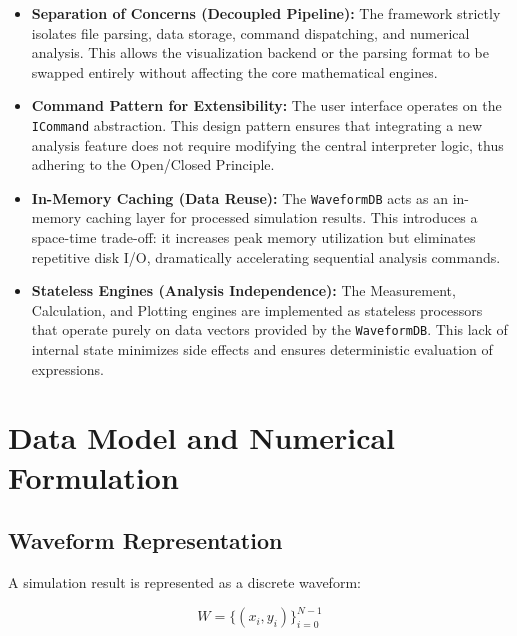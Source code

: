 \begin{itemize}
\item \textbf{Separation of Concerns (Decoupled Pipeline):} The framework strictly isolates file parsing, data storage, command dispatching, and numerical analysis. This allows the visualization backend or the parsing format to be swapped entirely without affecting the core mathematical engines.
\item \textbf{Command Pattern for Extensibility:} The user interface operates on the \texttt{ICommand} abstraction. This design pattern ensures that integrating a new analysis feature does not require modifying the central interpreter logic, thus adhering to the Open/Closed Principle.
\item \textbf{In-Memory Caching (Data Reuse):} The \texttt{WaveformDB} acts as an in-memory caching layer for processed simulation results. This introduces a space-time trade-off: it increases peak memory utilization but eliminates repetitive disk I/O, dramatically accelerating sequential analysis commands.
\item \textbf{Stateless Engines (Analysis Independence):} The Measurement, Calculation, and Plotting engines are implemented as stateless processors that operate purely on data vectors provided by the \texttt{WaveformDB}. This lack of internal state minimizes side effects and ensures deterministic evaluation of expressions.
\end{itemize}


\section{Data Model and Numerical Formulation}
\label{sec:pp-datamodel-algorithms}
\subsection{Waveform Representation}

A simulation result is represented as a discrete waveform:

\begin{equation}
W = \{(x_i,y_i)\}_{i=0}^{N-1}
\end{equation}

